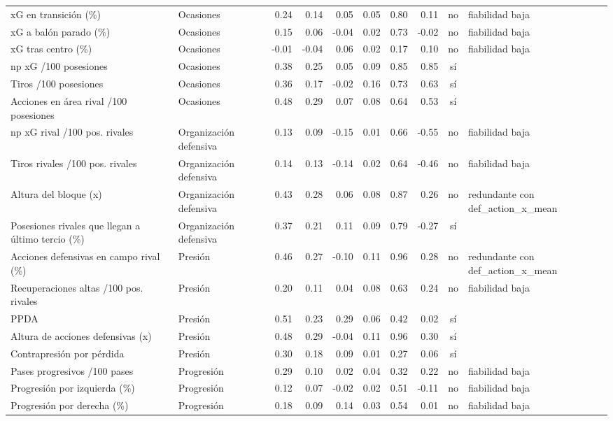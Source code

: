 {\begin{longtable}{p{4.2cm} p{2.3cm} rrrrrrc p{2.9cm}}
xG en transición (\%) & Ocasiones & 0.24 & 0.14 & 0.05 & 0.05 & 0.80 & 0.11 & no & fiabilidad baja \\
xG a balón parado (\%) & Ocasiones & 0.15 & 0.06 & -0.04 & 0.02 & 0.73 & -0.02 & no & fiabilidad baja \\
xG tras centro (\%) & Ocasiones & -0.01 & -0.04 & 0.06 & 0.02 & 0.17 & 0.10 & no & fiabilidad baja \\
np xG /100 posesiones & Ocasiones & 0.38 & 0.25 & 0.05 & 0.09 & 0.85 & 0.85 & sí &  \\
Tiros /100 posesiones & Ocasiones & 0.36 & 0.17 & -0.02 & 0.16 & 0.73 & 0.63 & sí &  \\
Acciones en área rival /100 posesiones & Ocasiones & 0.48 & 0.29 & 0.07 & 0.08 & 0.64 & 0.53 & sí &  \\
np xG rival /100 pos. rivales & Organización defensiva & 0.13 & 0.09 & -0.15 & 0.01 & 0.66 & -0.55 & no & fiabilidad baja \\
Tiros rivales /100 pos. rivales & Organización defensiva & 0.14 & 0.13 & -0.14 & 0.02 & 0.64 & -0.46 & no & fiabilidad baja \\
Altura del bloque (x) & Organización defensiva & 0.43 & 0.28 & 0.06 & 0.08 & 0.87 & 0.26 & no & redundante con def\_action\_x\_mean \\
Posesiones rivales que llegan a último tercio (\%) & Organización defensiva & 0.37 & 0.21 & 0.11 & 0.09 & 0.79 & -0.27 & sí &  \\
Acciones defensivas en campo rival (\%) & Presión & 0.46 & 0.27 & -0.10 & 0.11 & 0.96 & 0.28 & no & redundante con def\_action\_x\_mean \\
Recuperaciones altas /100 pos. rivales & Presión & 0.20 & 0.11 & 0.04 & 0.08 & 0.63 & 0.24 & no & fiabilidad baja \\
PPDA & Presión & 0.51 & 0.23 & 0.29 & 0.06 & 0.42 & 0.02 & sí &  \\
Altura de acciones defensivas (x) & Presión & 0.48 & 0.29 & -0.04 & 0.11 & 0.96 & 0.30 & sí &  \\
Contrapresión por pérdida & Presión & 0.30 & 0.18 & 0.09 & 0.01 & 0.27 & 0.06 & sí &  \\
Pases progresivos /100 pases & Progresión & 0.29 & 0.10 & 0.02 & 0.04 & 0.32 & 0.22 & no & fiabilidad baja \\
Progresión por izquierda (\%) & Progresión & 0.12 & 0.07 & -0.02 & 0.02 & 0.51 & -0.11 & no & fiabilidad baja \\
Progresión por derecha (\%) & Progresión & 0.18 & 0.09 & 0.14 & 0.03 & 0.54 & 0.01 & no & fiabilidad baja \\

\end{longtable}}
